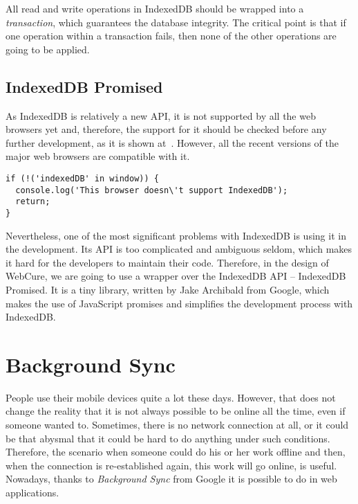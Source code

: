 All read and write operations in IndexedDB should be wrapped into a \textit{transaction}, which guarantees the database integrity. The critical point is that if one operation within a transaction fails, then none of the other operations are going to be applied. 

\subsection{IndexedDB Promised}

As IndexedDB is relatively a new API, it is not supported by all the web browsers yet and, therefore, the support for it should be checked before any further development, as it is shown at~. However, all the recent versions of the major web browsers are compatible with it. 

\begin{lstlisting}[caption={An example code, which demonstrates how one can check the support for IndexedDB API\cite{35}.}, label={lst:tech7}]
if (!('indexedDB' in window)) {
  console.log('This browser doesn\'t support IndexedDB');
  return;
}
\end{lstlisting}

Nevertheless, one of the most significant problems with IndexedDB is using it in the development. Its API is too complicated and ambiguous seldom, which makes it hard for the developers to maintain their code. Therefore, in the design of WebCure, we are going to use a wrapper over the IndexedDB API -- IndexedDB Promised\cite{36}. It is a tiny library, written by Jake Archibald from Google, which makes the use of JavaScript promises and simplifies the development process with IndexedDB.

\section{Background Sync}

People use their mobile devices quite a lot these days. However, that does not change the reality that it is not always possible to be online all the time, even if someone wanted to. Sometimes, there is no network connection at all, or it could be that abysmal that it could be hard to do anything under such conditions. Therefore, the scenario when someone could do his or her work offline and then, when the connection is re-established again, this work will go online, is useful. Nowadays, thanks to \textit{Background Sync}\cite{38} from Google it is possible to do in web applications. 

